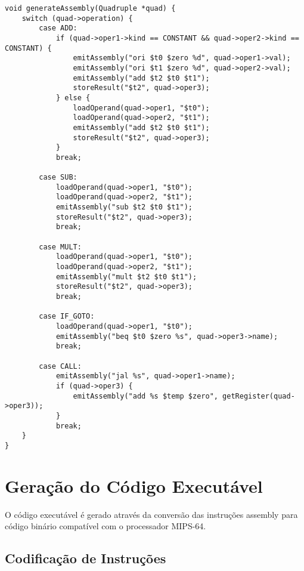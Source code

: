 \documentclass[
	12pt,				%
	oneside,
	a4paper,			%
	english,			%
	french,				%
	spanish,			%
	brazil,				%
	]{abntex2}
\begin{document}
\begin{lstlisting}[style=assemblystyle, caption=Tradução de quádruplas para assembly]
void generateAssembly(Quadruple *quad) {
    switch (quad->operation) {
        case ADD:
            if (quad->oper1->kind == CONSTANT && quad->oper2->kind == CONSTANT) {
                emitAssembly("ori $t0 $zero %d", quad->oper1->val);
                emitAssembly("ori $t1 $zero %d", quad->oper2->val);
                emitAssembly("add $t2 $t0 $t1");
                storeResult("$t2", quad->oper3);
            } else {
                loadOperand(quad->oper1, "$t0");
                loadOperand(quad->oper2, "$t1");
                emitAssembly("add $t2 $t0 $t1");
                storeResult("$t2", quad->oper3);
            }
            break;
            
        case SUB:
            loadOperand(quad->oper1, "$t0");
            loadOperand(quad->oper2, "$t1");
            emitAssembly("sub $t2 $t0 $t1");
            storeResult("$t2", quad->oper3);
            break;
            
        case MULT:
            loadOperand(quad->oper1, "$t0");
            loadOperand(quad->oper2, "$t1");
            emitAssembly("mult $t2 $t0 $t1");
            storeResult("$t2", quad->oper3);
            break;
            
        case IF_GOTO:
            loadOperand(quad->oper1, "$t0");
            emitAssembly("beq $t0 $zero %s", quad->oper3->name);
            break;
            
        case CALL:
            emitAssembly("jal %s", quad->oper1->name);
            if (quad->oper3) {
                emitAssembly("add %s $temp $zero", getRegister(quad->oper3));
            }
            break;
    }
}
\end{lstlisting}

\section{Geração do Código Executável}

O código executável é gerado através da conversão das instruções assembly para código binário compatível com o processador MIPS-64.

\subsection{Codificação de Instruções}
\end{document}
